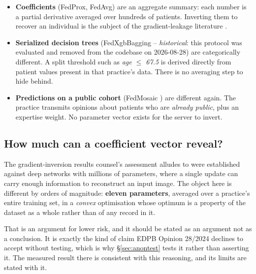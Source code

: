 \begin{itemize}
  \item \textbf{Coefficients} (FedProx, FedAvg) are an aggregate summary: each number is a
        partial derivative averaged over hundreds of patients. Inverting them to recover an
        individual is the subject of the gradient-leakage literature \cite{zhu2019leakage}.
  \item \textbf{Serialized decision trees} (FedXgbBagging -- \emph{historical}: this protocol was
        evaluated and removed from the codebase on 2026-08-28) are categorically different. A split
        threshold such as \emph{age $\le$ 67.5} is derived directly from patient values present in
        that practice's data. There is no averaging step to hide behind.
  \item \textbf{Predictions on a public cohort} (FedMosaic \cite{fedmosaic}) are different again.
        The practice transmits opinions about patients who are \emph{already public}, plus an
        expertise weight. No parameter vector exists for the server to invert.
\end{itemize}

\subsection{How much can a coefficient vector reveal?}

The gradient-inversion results counsel's assessment alludes to were established against deep
networks with millions of parameters, where a single update can carry enough information to
reconstruct an input image. The object here is different by orders of magnitude: \textbf{eleven
parameters}, averaged over a practice's entire training set, in a \emph{convex} optimisation whose
optimum is a property of the dataset as a whole rather than of any record in it.

That is an argument for lower risk, and it should be stated as an argument not as a conclusion.
It is exactly the kind of claim EDPB Opinion 28/2024 \cite{edpb2024ai} declines to accept without
testing, which is why \S\ref{sec:anontest} tests it rather than asserting it. The measured result
there is consistent with this reasoning, and its limits are stated with it.
